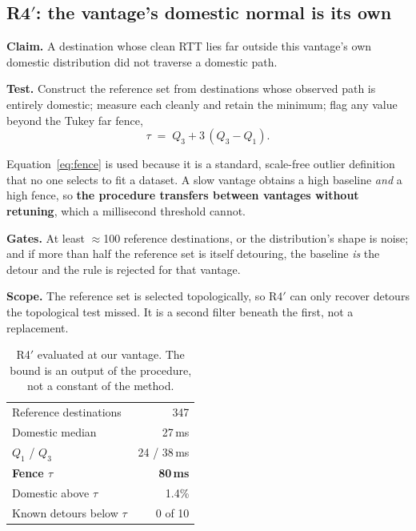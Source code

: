 \subsection{R4$'$: the vantage's domestic normal is its own}

\textbf{Claim.} A destination whose clean RTT lies far outside this vantage's own domestic
distribution did not traverse a domestic path.

\textbf{Test.} Construct the reference set from destinations whose observed path is
entirely domestic; measure each cleanly and retain the minimum; flag any value beyond the
Tukey far fence,
\begin{equation}
\tau \;=\; Q_3 + 3\,(Q_3 - Q_1).
\label{eq:fence}
\end{equation}

Equation~\eqref{eq:fence} is used because it is a standard, scale-free outlier definition
that no one selects to fit a dataset. A slow vantage obtains a high baseline \emph{and} a
high fence, so \textbf{the procedure transfers between vantages without retuning}, which a
millisecond threshold cannot.

\textbf{Gates.} At least $\approx$100 reference destinations, or the distribution's shape
is noise; and if more than half the reference set is itself detouring, the baseline
\emph{is} the detour and the rule is rejected for that vantage.

\textbf{Scope.} The reference set is selected topologically, so R4$'$ can only recover
detours the topological test missed. It is a second filter beneath the first, not a
replacement.

\begin{table}[t]
\centering
\caption{R4$'$ evaluated at our vantage. The bound is an output of the procedure, not a
constant of the method.}
\label{tab:r4}
\begin{tabular}{lr}
\toprule
Reference destinations              & 347 \\
Domestic median                     & 27\,ms \\
$Q_1$ / $Q_3$                       & 24 / 38\,ms \\
\textbf{Fence $\tau$}               & \textbf{80\,ms} \\
Domestic above $\tau$               & 1.4\% \\
Known detours below $\tau$          & 0 of 10 \\
\bottomrule
\end{tabular}
\end{table}

